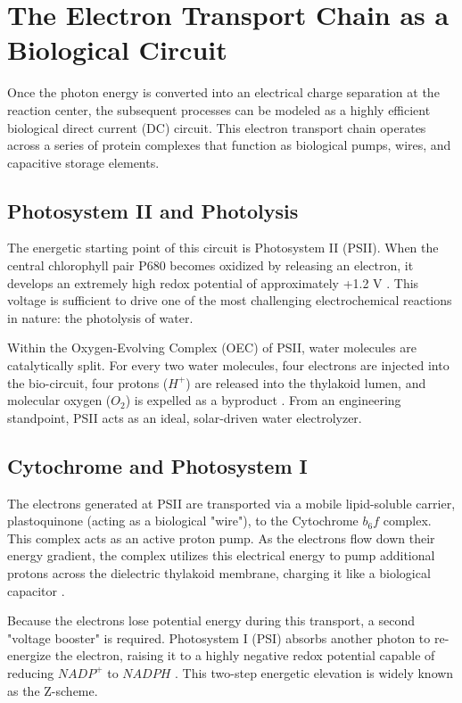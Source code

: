 \documentclass[conference]{IEEEtran}
\begin{document}
\section{The Electron Transport Chain as a Biological Circuit}
Once the photon energy is converted into an electrical charge separation at the reaction center, the subsequent processes can be modeled as a highly efficient biological direct current (DC) circuit. This electron transport chain operates across a series of protein complexes that function as biological pumps, wires, and capacitive storage elements.

\subsection{Photosystem II and Photolysis}
The energetic starting point of this circuit is Photosystem II (PSII). When the central chlorophyll pair P680 becomes oxidized by releasing an electron, it develops an extremely high redox potential of approximately +1.2 V \cite{PLATZHALTER_1}. This voltage is sufficient to drive one of the most challenging electrochemical reactions in nature: the photolysis of water. 

Within the Oxygen-Evolving Complex (OEC) of PSII, water molecules are catalytically split. For every two water molecules, four electrons are injected into the bio-circuit, four protons ($H^+$) are released into the thylakoid lumen, and molecular oxygen ($O_2$) is expelled as a byproduct \cite{PLATZHALTER_2}. From an engineering standpoint, PSII acts as an ideal, solar-driven water electrolyzer.

\subsection{Cytochrome and Photosystem I}
The electrons generated at PSII are transported via a mobile lipid-soluble carrier, plastoquinone (acting as a biological "wire"), to the Cytochrome $b_6f$ complex. This complex acts as an active proton pump. As the electrons flow down their energy gradient, the complex utilizes this electrical energy to pump additional protons across the dielectric thylakoid membrane, charging it like a biological capacitor \cite{PLATZHALTER_3}.

Because the electrons lose potential energy during this transport, a second "voltage booster" is required. Photosystem I (PSI) absorbs another photon to re-energize the electron, raising it to a highly negative redox potential capable of reducing $NADP^+$ to $NADPH$ \cite{PLATZHALTER_4}. This two-step energetic elevation is widely known as the Z-scheme.
\end{document}

